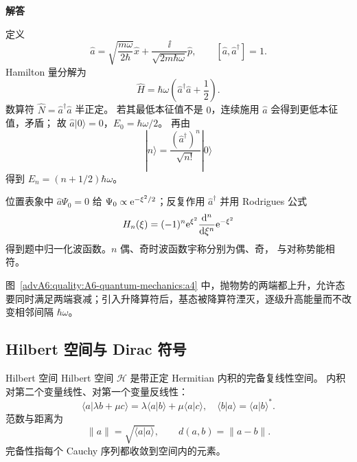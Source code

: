 \begin{advsolution}
\begin{center}\begin{minipage}{.96\linewidth}\centering
\raggedright{\bfseries\color{DeepBlue}解答}\par\smallskip\centering

\label{advA6:quality:A6-quantum-mechanics:a4}
\end{minipage}\end{center}

定义
\[
 \widehat a=
 \sqrt{\frac{m\omega}{2\hbar}}\widehat x
 +\frac{\ii}{\sqrt{2m\hbar\omega}}\widehat p,\qquad
 [\widehat a,\widehat a^\dagger]=1.
\]
Hamilton 量分解为
\[
 \widehat H=\hbar\omega
 \left(\widehat a^\dagger\widehat a+\frac12\right).
\]
数算符 $\widehat N=\widehat a^\dagger\widehat a$ 半正定。
若其最低本征值不是 $0$，连续施用 $\widehat a$ 会得到更低本征值，矛盾；
故 $\widehat a|0\rangle=0$，$E_0=\hbar\omega/2$。
再由
\[
 |n\rangle=\frac{(\widehat a^\dagger)^n}{\sqrt{n!}}|0\rangle
\]
得到 $E_n=(n+1/2)\hbar\omega$。

位置表象中 $\widehat a\Psi_0=0$ 给
$\Psi_0\propto\mathrm e^{-\xi^2/2}$；反复作用
$\widehat a^\dagger$ 并用 Rodrigues 公式
\[
 H_n(\xi)=(-1)^n\mathrm e^{\xi^2}
 \frac{\mathop{}\!\mathrm d^n}{\mathop{}\!\mathrm d\xi^n}\mathrm e^{-\xi^2}
\]
得到题中归一化波函数。$n$ 偶、奇时波函数宇称分别为偶、奇，
与对称势能相符。

图~\ref{advA6:quality:A6-quantum-mechanics:a4} 中，抛物势的两端都上升，允许态要同时满足两端衰减；引入升降算符后，基态被降算符湮灭，逐级升高能量而不改变相邻间隔 $\hbar\omega$。
\end{advsolution}

\subsection{Hilbert 空间与 Dirac 符号}

\begin{advdefinition}{Hilbert 空间}\label{advA6:def:hilbert}
Hilbert 空间 $\mathcal H$ 是带正定 Hermitian 内积的完备复线性空间。
内积对第二个变量线性、对第一个变量反线性：
\[
 \langle a|\lambda b+\mu c\rangle
 =\lambda\langle a|b\rangle+\mu\langle a|c\rangle,
\quad
 \langle b|a\rangle=\langle a|b\rangle^*.
\]
范数与距离为
\[
 \|a\|=\sqrt{\langle a|a\rangle},\qquad
 d(a,b)=\|a-b\|.
\]
完备性指每个 Cauchy 序列都收敛到空间内的元素。
\end{advdefinition}

